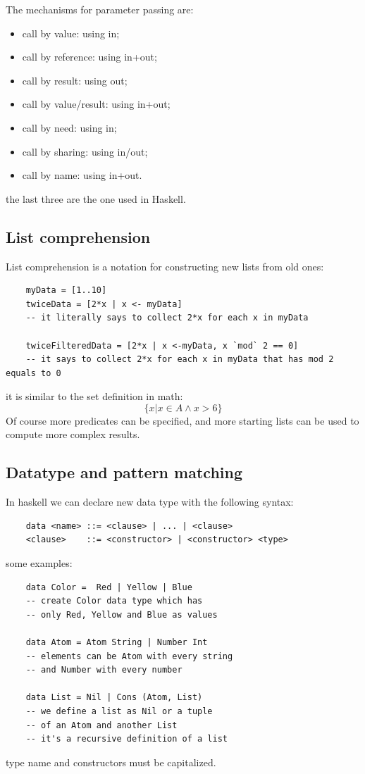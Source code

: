 The mechanisms for parameter passing are:
\begin{itemize}
    \item call by value: using in;
    \item call by reference: using in+out;
    \item call by result: using out;
    \item call by value/result: using in+out;
    \item call by need: using in;
    \item call by sharing: using in/out;
    \item call by name: using in+out.
\end{itemize}
the last three are the one used in Haskell.

\subsection{List comprehension}
List comprehension is a notation for constructing new lists from old ones:
\begin{verbatim}
    myData = [1..10]
    twiceData = [2*x | x <- myData]
    -- it literally says to collect 2*x for each x in myData

    twiceFilteredData = [2*x | x <-myData, x `mod` 2 == 0]
    -- it says to collect 2*x for each x in myData that has mod 2 equals to 0
\end{verbatim}
it is similar to the set definition in math:
$$
\{ x | x \in A \land x > 6 \}
$$
Of course more predicates can be specified, and more starting lists can be used to compute more complex results.


\subsection{Datatype and pattern matching}
In haskell we can declare new data type with the following syntax:
\begin{verbatim}
    data <name> ::= <clause> | ... | <clause>
    <clause>    ::= <constructor> | <constructor> <type>
\end{verbatim}
some examples:
\begin{verbatim}
    data Color =  Red | Yellow | Blue
    -- create Color data type which has
    -- only Red, Yellow and Blue as values

    data Atom = Atom String | Number Int
    -- elements can be Atom with every string
    -- and Number with every number

    data List = Nil | Cons (Atom, List)
    -- we define a list as Nil or a tuple
    -- of an Atom and another List
    -- it's a recursive definition of a list
\end{verbatim}
type name and constructors must be capitalized.

